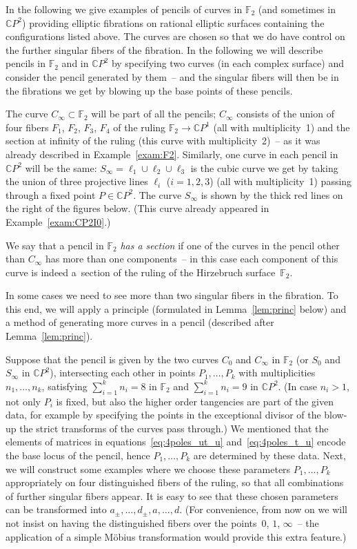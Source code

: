 \documentclass[pdftex]{sigma}
\newcommand{\CP}[1]{\mathbb{C}P^{#1}} %
\numberwithin{equation}{section}
\begin{document}
In the following we give examples of pencils of curves in ${\mathbb
 {F}}_2$ (and sometimes in $\CP{2}$) providing elliptic fibrations on rational
elliptic surfaces containing the configurations listed above.
The curves are chosen so that we do have control on the further
singular fibers of the fibration. In the following we will describe
pencils in ${\mathbb {F}}_2$ and in $\CP{2}$ by specifying two curves
(in each complex surface) and consider the pencil generated by them~-- and the singular fibers will then be in the fibrations we get by
blowing up {the base points of} these pencils.

The curve $C_{\infty}\subset
{\mathbb {F}}_2$ will be part of all the pencils; $C_{\infty}$
consists of the union of four fibers $F_1$, $F_2$, $F_3$, $F_4$ of the ruling
${\mathbb {F}}_2\to \CP{1}$ (all with multiplicity~1) and the section
at infinity of the ruling (this curve with multiplicity~2)~-- as it
was already described in Example~\ref{exam:F2}.
Similarly, one curve in each pencil in~$\CP{2}$ will be the same:
$S_{\infty}=\ell _1\cup \ell _2\cup \ell _3$ is the cubic curve we get
by taking the union of three projective lines $\ell _i$ ($i=1,2,3$)
(all with multiplicity~1) passing through a fixed point $P\in
\CP{2}$. The curve $S_{\infty}$ is shown by the thick red lines on the right of
the figures below. (This curve already appeared in Example~\ref{exam:CP2I0}.)

We say that a pencil in ${\mathbb {F}}_2$ \emph{has a section}
if one of the curves in the pencil other than $C_{\infty}$
has more than one components~-- in this case each component
of this curve is indeed a~section of the ruling of
the Hirzebruch surface~${\mathbb {F}}_2$.

In some cases we need to see more than two singular fibers in the
fibration. To this end, we will apply a principle (formulated in
Lemma~\ref{lem:princ} below) and a method of generating more curves in
a pencil (described after Lemma~\ref{lem:princ}).

Suppose that the pencil is given by the two curves $C_0$ and
$C_{\infty}$ in ${\mathbb {F}}_2$ (or $S_0$ and $S_{\infty}$ in
$\CP{2}$), intersecting each other in points $P_1, \ldots , P_k$ with
multiplicities $n_1, \ldots ,n_k$, satisfying $\sum_{i=1}^kn_i=8$ in
${\mathbb {F}}_2$ and $\sum_{i=1}^kn_i=9$ in $\CP{2}$. (In case
$n_i>1$, not only $P_i$ is fixed, but also the higher order tangencies
are part of the given data, for example by specifying the points in
the exceptional divisor of the blow-up the strict transforms of the
curves pass through.) We mentioned that the elements of matrices in
equations~\eqref{eq:4poles_ut_u} and~\eqref{eq:4poles_t_u} encode the
base locus of the pencil, hence $P_1, \ldots , P_k$ are determined by
these data. Next, we will construct some examples where we choose
these parameters $P_1, \ldots , P_k$ appropriately on four
distinguished fibers of the ruling, so that all combinations of
further singular fibers appear. It is easy to see that these chosen
parameters can be transformed into $a_{\pm}, \dots, d_{\pm}, a, \dots,
d$. (For convenience, from now on we will not insist on having the
distinguished fibers over the points~$0$, $1$, $\infty$~-- the application
of a simple M\"obius transformation would provide this extra feature.)
\end{document}
